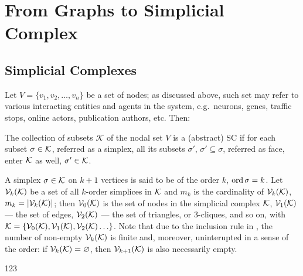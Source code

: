 \section{ From Graphs to Simplicial Complex }


\subsection{ Simplicial Complexes }


Let \( V = \{ v_1, v_2, \ldots, v_n \} \) be a set of nodes; as discussed above, such set may refer to various interacting entities and agents in the system, e.g.\ neurons, genes, traffic stops, online actors, publication authors, etc. Then: 

\begin{definition}\label{def:simplicial_complex}
      The collection of subsets \( \mathcal K \) of the nodal set \( V \) is  a (abstract) \gls{SC} if for each subset \( \sigma \in \mathcal{K} \), referred as a \gls{simplex}, all its subsets \( \sigma'\), \( \sigma' \subseteq \sigma \), referred as \gls{face}, enter \( \mathcal{K} \) as well, \( \sigma' \in \mathcal{K}\).
\end{definition}

A simplex \( \sigma \in \mathcal{K} \) on \( k + 1 \) vertices is said to be of the order \( k \), \( \mathrm{ord}\,\sigma = k \). Let \( \mathcal{V}_{k}(\mathcal{K}) \) be a set of all \(k\)-order simplices in \( \mathcal{K} \) and \( m_k \) is the cardinality of \( \mathcal{V}_{k}(\mathcal{K})\), \( m_k = | \mathcal{V}_{k}(\mathcal{K}) | \); then \( \mathcal{V}_{0}(\mathcal{K}) \) is the set of nodes in the simplicial complex \( \mathcal{K} \), \( \mathcal{V}_{1}(\mathcal{K}) \) --- the set of edges, \( \mathcal{V}_{2}(\mathcal{K}) \) --- the set of triangles, or \(3\)-cliques, and so on, with \( \mathcal{K} = \{ \mathcal{V}_{0}(\mathcal{K}), \mathcal{V}_{1}(\mathcal{K}), \mathcal{V}_{2}(\mathcal{K}) \ldots \} \). Note that due to the inclusion rule in , the number of non-empty \( \mathcal{V}_{k}(\mathcal{K}) \) is finite and, moreover, uninterupted in a sense of the order: if \( \mathcal{V}_{k}(\mathcal{K}) = \varnothing \), then \( \mathcal{V}_{k+1}(\mathcal{K}) \) is also necessarily empty.

\begin{example}

      123
      
\end{example}